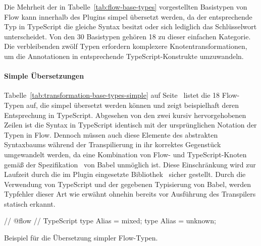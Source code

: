 Die Mehrheit der in Tabelle~\ref{tab:flow-base-types} vorgestellten Basistypen von Flow kann innerhalb des Plugins simpel übersetzt werden, da der entsprechende Typ in TypeScript die gleiche Syntax besitzt oder sich lediglich das Schlüsselwort unterscheidet. Von den 30 Basistypen gehören 18 zu dieser einfachen Kategorie. Die verbleibenden zwölf Typen erfordern komplexere Knotentransformationen, um die Annotationen in entsprechende TypeScript-Konstrukte umzuwandeln.

\paragraph{Simple Übersetzungen}

Tabelle~\ref{tab:transformation-base-types-simple} auf Seite~\pageref{tab:transformation-base-types-simple} listet die 18 Flow-Typen auf, die simpel übersetzt werden können und zeigt beispielhaft deren Entsprechung in TypeScript. Abgesehen von den zwei kursiv hervorgehobenen Zeilen ist die Syntax in TypeScript identisch mit der ursprünglichen Notation der Typen in Flow. Dennoch müssen auch diese Elemente des abstrakten Syntaxbaums während der Transpilierung in ihr korrektes Gegenstück umgewandelt werden, da eine Kombination von Flow- und TypeScript-Knoten gemäß der Spezifikation~\autocite{BABEL:PARSER_SPEC} von Babel unmöglich ist. Diese Einschränkung wird zur Laufzeit durch die im Plugin eingesetzte Bibliothek \,\autocite{BABEL:TYPES} sicher gestellt. Durch die Verwendung von TypeScript und der gegebenen Typisierung von Babel, werden Typfehler dieser Art wie erwähnt ohnehin bereits vor Ausführung des Transpilers statisch erkannt.

\bigbreak


\bigbreak
\begin{listing}[htb]
\begin{textcode}
// @flow                              // TypeScript
type Alias = mixed;                  type Alias = unknown;
\end{textcode}
\listingvspace
\caption{Beispiel für die Übersetzung simpler Flow-Typen.}
\label{code:example-simple}
\end{listing}


